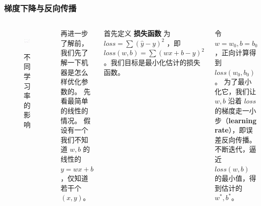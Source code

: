 \begin{frame}
    \frametitle{梯度下降与反向传播}
    \begin{columns}
        \begin{figure}
            \centering
            \includegraphics[width=\linewidth]{../lib/lr.png}
            \label{learningrates}
            \caption{不同学习率的影响}
        \end{figure}
        再进一步了解前，我们先了解一下机器是怎么样优化参数的。
        先看最简单的线性的情况。
        假设有一个我们不知道 $w,b$ 的线性的 $y=wx+b$ ，仅知道若干个 $(x,y)$。

        首先定义 \textbf{损失函数} 为 $loss = \sum{(\hat{y}-y)^2}$ ，即 $loss(w, b)=\sum(wx+b-y)^2$ 。我们目标是最小化估计的损失函数。

        令 $w=w_0,b=b_0$ ，正向计算得到 $loss(w_0,b_0)$。
        为了最小化它，我们让 $w,b$ 沿着 $loss$ 的梯度走一小步（\textbf{learning rate}），即误差反向传播。
        不断迭代，逼近 $loss(w,b)$ 的最小值，得到估计的 $w^*,b^*$。
    \end{columns}
\end{frame}

